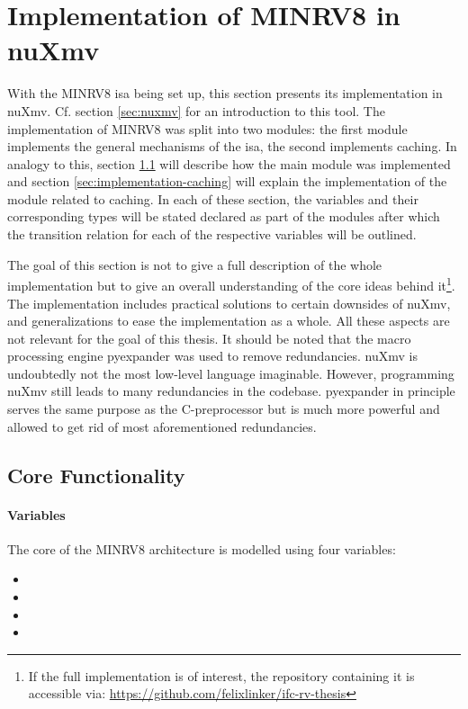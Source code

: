 \section{Implementation of MINRV8 in nuXmv}
\label{sec:model-implementation}

With the MINRV8 \gls{isa} being set up, this section presents its implementation in nuXmv.
Cf. section \ref{sec:nuxmv} for an introduction to this tool.
The implementation of MINRV8 was split into two modules:
the first module implements the general mechanisms of the \gls{isa}, the second implements caching.
In analogy to this, section \ref{sec:implementation-core} will describe how the main module was implemented and section \ref{sec:implementation-caching} will explain the implementation of the module related to caching.
In each of these section, the variables and their corresponding types will be stated declared as part of the modules after which the transition relation for each of the respective variables will be outlined.

The goal of this section is not to give a full description of the whole implementation but to give an overall understanding of the core ideas behind it\footnote{%
    If the full implementation is of interest, the repository containing it is accessible via: \url{https://github.com/felixlinker/ifc-rv-thesis}
}.
The implementation includes practical solutions to certain downsides of nuXmv, and generalizations to ease the implementation as a whole.
All these aspects are not relevant for the goal of this thesis.
It should be noted that the macro processing engine pyexpander \cite{pyexpander} was used to remove redundancies.
nuXmv is undoubtedly not the most low-level language imaginable.
However, programming nuXmv still leads to many redundancies in the codebase.
pyexpander in principle serves the same purpose as the C-preprocessor but is much more powerful and allowed to get rid of most aforementioned redundancies.

\subsection{Core Functionality}
\label{sec:implementation-core}

\paragraph{Variables}
The core of the MINRV8 architecture is modelled using four variables:
\begin{itemize}
    \item {}
    \item {}
    \item {}
    \item {}
\end{itemize}

